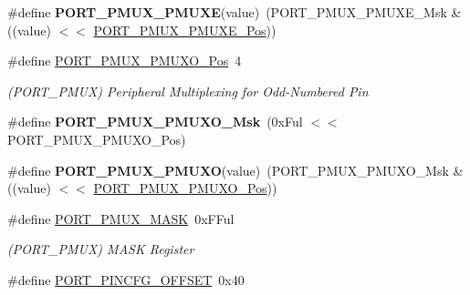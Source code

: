 \begin{DoxyCompactItemize}
\item 
\hypertarget{group___s_a_m_l21___p_o_r_t_ga1a0548ef99b601e76ee01c5de4b8f32b}{}\#define {\bfseries P\+O\+R\+T\+\_\+\+P\+M\+U\+X\+\_\+\+P\+M\+U\+X\+E}(value)~(P\+O\+R\+T\+\_\+\+P\+M\+U\+X\+\_\+\+P\+M\+U\+X\+E\+\_\+\+Msk \& ((value) $<$$<$ \hyperlink{group___s_a_m_l21___p_o_r_t_ga38a4c4871ecabeb4ad36398b73685bac}{P\+O\+R\+T\+\_\+\+P\+M\+U\+X\+\_\+\+P\+M\+U\+X\+E\+\_\+\+Pos}))\label{group___s_a_m_l21___p_o_r_t_ga1a0548ef99b601e76ee01c5de4b8f32b}

\item 
\hypertarget{group___s_a_m_l21___p_o_r_t_ga80a28619ad2db553b64d4ce4545368d3}{}\#define \hyperlink{group___s_a_m_l21___p_o_r_t_ga80a28619ad2db553b64d4ce4545368d3}{P\+O\+R\+T\+\_\+\+P\+M\+U\+X\+\_\+\+P\+M\+U\+X\+O\+\_\+\+Pos}~4\label{group___s_a_m_l21___p_o_r_t_ga80a28619ad2db553b64d4ce4545368d3}

\begin{DoxyCompactList}\small\item\em (P\+O\+R\+T\+\_\+\+P\+M\+U\+X) Peripheral Multiplexing for Odd-\/\+Numbered Pin \end{DoxyCompactList}\item 
\hypertarget{group___s_a_m_l21___p_o_r_t_gafd360b4eecfb7fb93fde5c9e1c6da3a0}{}\#define {\bfseries P\+O\+R\+T\+\_\+\+P\+M\+U\+X\+\_\+\+P\+M\+U\+X\+O\+\_\+\+Msk}~(0x\+Ful $<$$<$ P\+O\+R\+T\+\_\+\+P\+M\+U\+X\+\_\+\+P\+M\+U\+X\+O\+\_\+\+Pos)\label{group___s_a_m_l21___p_o_r_t_gafd360b4eecfb7fb93fde5c9e1c6da3a0}

\item 
\hypertarget{group___s_a_m_l21___p_o_r_t_ga9e83be4ac2a68323e1910518c9290f21}{}\#define {\bfseries P\+O\+R\+T\+\_\+\+P\+M\+U\+X\+\_\+\+P\+M\+U\+X\+O}(value)~(P\+O\+R\+T\+\_\+\+P\+M\+U\+X\+\_\+\+P\+M\+U\+X\+O\+\_\+\+Msk \& ((value) $<$$<$ \hyperlink{group___s_a_m_l21___p_o_r_t_ga80a28619ad2db553b64d4ce4545368d3}{P\+O\+R\+T\+\_\+\+P\+M\+U\+X\+\_\+\+P\+M\+U\+X\+O\+\_\+\+Pos}))\label{group___s_a_m_l21___p_o_r_t_ga9e83be4ac2a68323e1910518c9290f21}

\item 
\hypertarget{group___s_a_m_l21___p_o_r_t_ga1b48850f8861140de4eb5b75544f05e7}{}\#define \hyperlink{group___s_a_m_l21___p_o_r_t_ga1b48850f8861140de4eb5b75544f05e7}{P\+O\+R\+T\+\_\+\+P\+M\+U\+X\+\_\+\+M\+A\+S\+K}~0x\+F\+Ful\label{group___s_a_m_l21___p_o_r_t_ga1b48850f8861140de4eb5b75544f05e7}

\begin{DoxyCompactList}\small\item\em (P\+O\+R\+T\+\_\+\+P\+M\+U\+X) M\+A\+S\+K Register \end{DoxyCompactList}\item 
\hypertarget{group___s_a_m_l21___p_o_r_t_ga5329a91f7ccfbc23850b5be176724aec}{}\#define \hyperlink{group___s_a_m_l21___p_o_r_t_ga5329a91f7ccfbc23850b5be176724aec}{P\+O\+R\+T\+\_\+\+P\+I\+N\+C\+F\+G\+\_\+\+O\+F\+F\+S\+E\+T}~0x40\label{group___s_a_m_l21___p_o_r_t_ga5329a91f7ccfbc23850b5be176724aec}


\end{DoxyCompactItemize}
